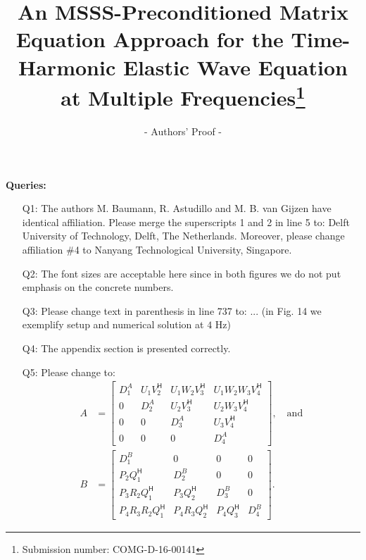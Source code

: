 \documentclass{article}
\newcommand{\trp}{\mathsf{H}}
\begin{document}
\title{\bf An MSSS-Preconditioned Matrix Equation Approach for the Time-Harmonic Elastic Wave Equation at Multiple Frequencies\footnote{Submission number: COMG-D-16-00141}}
\author{- Authors' Proof -}

\maketitle


\noindent \textbf{Queries:}

\begin{itemize}
 \item[Q1:] The authors M. Baumann, R. Astudillo and M. B. van Gijzen have identical affiliation. Please merge the superscripts 1 and 2 in line 5 to: \textsf{Delft University of Technology, Delft, The Netherlands}. Moreover, please change affiliation \#4 to \textsf{Nanyang Technological University, Singapore}.
 \item[Q2:] The font sizes are acceptable here since in both figures we do not put emphasis on the concrete numbers.
 \item[Q3:] Please change text in parenthesis in line 737 to: ... (in Fig. 14 we exemplify setup and numerical solution at $4$ Hz) 
 \item[Q4:] The appendix section is presented correctly.
 \item[Q5:] Please change to:
 \begin{align*}
A &= \begin{bmatrix}
    D_1^A & U_1V_2^\trp & U_1W_2V_3^\trp & U_1W_2W_3V_4^\trp \\
    0 & D_2^A & U_2V_3^\trp & U_2W_3V_4^\trp  \\
    0 & 0 & D_3^A & U_3V_4^\trp  \\
    0 & 0 & 0 & D_4^A
    \end{bmatrix}, \quad \text{and}
\\
B &= \begin{bmatrix}
    D_1^B & 0 & 0 & 0 \\
    P_2Q_1^\trp & D_2^B & 0 & 0  \\
    P_3R_2Q_1^\trp & P_3Q_2^\trp & D_3^B & 0  \\
    P_4R_3R_2Q_1^\trp & P_4R_3Q_2^\trp & P_4Q_3^\trp & D_4^B
    \end{bmatrix}.
\end{align*}
\end{itemize}

\vspace{0.4cm}
\end{document}
